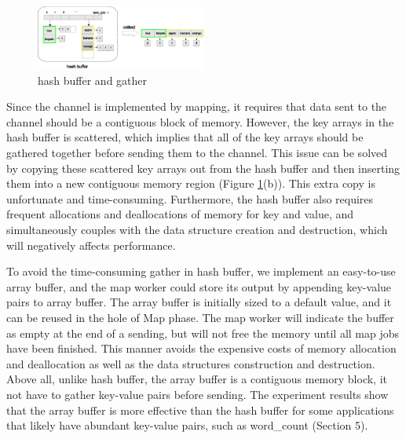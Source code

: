 \begin{figure}[!h!t]  
	\centering
	\includegraphics[width=0.5\textwidth]{eps/dmr_hash_buffer.eps}
	\caption{hash buffer and gather}
	\label{fig:dmr:hash-buffer}
\end{figure}



Since the channel is implemented by mapping, it requires that data sent to the channel should be a contiguous block of memory.
However, the key arrays in the hash buffer is scattered, which implies that all of the key arrays should be gathered together before sending them to the channel.
This issue can be solved by copying these scattered key arrays out from the hash buffer and then inserting them into a new contiguous memory region (Figure \ref{fig:dmr:hash-buffer}(b)).
This extra copy is unfortunate and time-consuming.
Furthermore, the hash buffer also requires frequent allocations and deallocations of memory for key and value, and simultaneously couples with the data structure creation and destruction, which will 
negatively affects performance.


To avoid the time-consuming gather in hash buffer, we  implement an easy-to-use array buffer, and the map worker could store its output by appending  key-value pairs to array buffer.
The array buffer is initially sized to a default value, and it can be reused in the hole of Map phase.
The map worker will indicate the buffer as empty at the end of a sending, but will not free the memory until all map jobs have been finished.
This manner avoids the expensive costs of memory allocation and deallocation as well as the data structures construction and destruction.
Above all, unlike hash buffer, the array buffer is a contiguous memory block, it not have to gather key-value pairs before sending.
The experiment results show that the array buffer is more effective than the hash buffer for some applications that likely have abundant key-value pairs, such as word\_count (Section 5).

